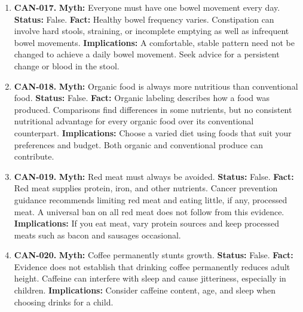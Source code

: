 \documentclass[11pt,oneside]{book}
\begin{document}
\begin{enumerate}[leftmargin=0pt,labelwidth=0pt,labelsep=0pt,itemindent=0pt]
\textbf{Implications:} After a break, return to activity progressively and choose a training load that fits your current strength.
\item[] \textbf{CAN-017.} \textbf{Myth:} Everyone must have one bowel movement every day.\newline
\textbf{Status:} False.\newline
\textbf{Fact:} Healthy bowel frequency varies. Constipation can involve hard stools, straining, or incomplete emptying as well as infrequent bowel movements. \cite{ref388}\newline
\textbf{Implications:} A comfortable, stable pattern need not be changed to achieve a daily bowel movement. Seek advice for a persistent change or blood in the stool.
\item[] \textbf{CAN-018.} \textbf{Myth:} Organic food is always more nutritious than conventional food.\newline
\textbf{Status:} False.\newline
\textbf{Fact:} Organic labeling describes how a food was produced. Comparisons find differences in some nutrients, but no consistent nutritional advantage for every organic food over its conventional counterpart. \cite{ref184}\newline
\textbf{Implications:} Choose a varied diet using foods that suit your preferences and budget. Both organic and conventional produce can contribute.
\item[] \textbf{CAN-019.} \textbf{Myth:} Red meat must always be avoided.\newline
\textbf{Status:} False.\newline
\textbf{Fact:} Red meat supplies protein, iron, and other nutrients. Cancer prevention guidance recommends limiting red meat and eating little, if any, processed meat. A universal ban on all red meat does not follow from this evidence. \cite{ref389}\newline
\textbf{Implications:} If you eat meat, vary protein sources and keep processed meats such as bacon and sausages occasional.
\item[] \textbf{CAN-020.} \textbf{Myth:} Coffee permanently stunts growth.\newline
\textbf{Status:} False.\newline
\textbf{Fact:} Evidence does not establish that drinking coffee permanently reduces adult height. Caffeine can interfere with sleep and cause jitteriness, especially in children. \cite{ref390}\newline
\textbf{Implications:} Consider caffeine content, age, and sleep when choosing drinks for a child.

\end{enumerate}
\end{document}
